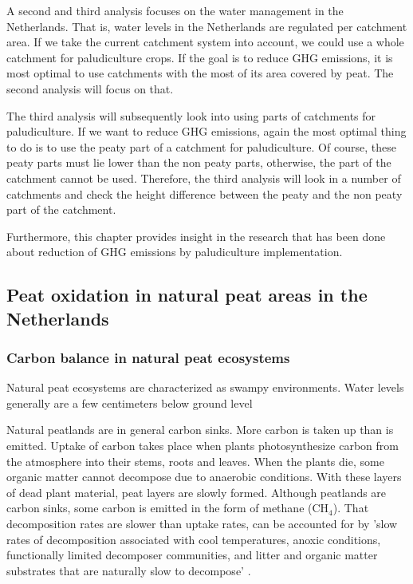 \documentclass[12pt,a4paper,titlepage]{article}
\newcommand{\sous}[1]{\ensuremath{_{\textrm{#1}}}}
\begin{document}
A second and third analysis focuses on the water management in the Netherlands. That is, water levels in the Netherlands are regulated per catchment area. If we take the current catchment system into account, we could use a whole catchment for paludiculture crops. If the goal is to reduce GHG emissions, it is most optimal to use catchments with the most of its area covered by peat. The second analysis will focus on that.

The third analysis will subsequently look into using parts of catchments for paludiculture. If we want to reduce GHG emissions, again the most optimal thing to do is to use the peaty part of a catchment for paludiculture. Of course, these peaty parts must lie lower than the non peaty parts, otherwise, the part of the catchment cannot be used. Therefore, the third analysis will look in a number of catchments and check the height difference between the peaty and the non peaty part of the catchment.

Furthermore, this chapter provides insight in the research that has been done about reduction of GHG emissions by paludiculture implementation.

\subsection{Peat oxidation in natural peat areas in the Netherlands}







\subsubsection{Carbon balance in natural peat ecosystems}

Natural peat ecosystems are characterized as swampy environments. Water levels generally are a few centimeters below ground level \citep{wichtmann2016paludiculture}


Natural peatlands are in general carbon sinks. More carbon is taken up than is emitted. Uptake of carbon takes place when plants photosynthesize carbon from the atmosphere into their stems, roots and leaves. When the plants die, some organic matter cannot decompose due to anaerobic conditions. With these layers of dead plant material, peat layers are slowly formed. Although peatlands are carbon sinks, some carbon is emitted in the form of methane (CH\sous{4}). That decomposition rates are slower than uptake rates, can be accounted for by 'slow rates of decomposition associated with cool temperatures, anoxic  conditions,  functionally  limited  decomposer  communities,  and  litter  and  organic  matter  substrates  that are naturally slow to decompose' \citep{moore2007litter}.
\end{document}
